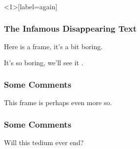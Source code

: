 \documentclass{beamer}%
\begin{document}
\begin{frame}<1>[label=again]
  \frametitle{The Infamous Disappearing Text}

Here is a frame, it's a bit \alert<2-3>{boring}.

It's so boring, we'll see it .



\end{frame}

\begin{frame}
\frametitle{Some Comments}
This frame is perhaps even more so.
\end{frame}


\begin{frame}
\frametitle{Some Comments}
Will this tedium ever end?
\end{frame}
\end{document}
